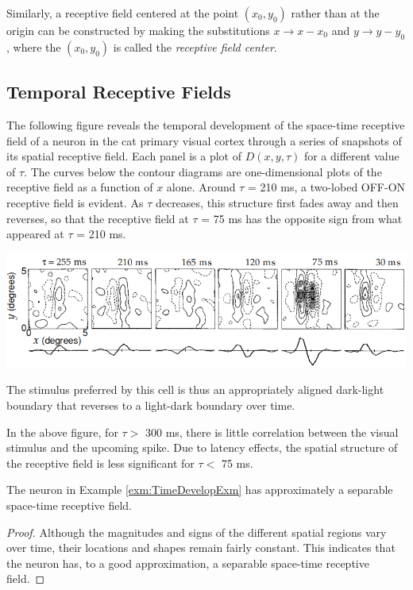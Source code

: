 \begin{rem}
  Similarly, a receptive field centered at the point $(x_0, y_0)$ rather than at the origin can be constructed by making the substitutions $x \to x-x_0$ and $y \to y-y_0$, where the $(x_0, y_0)$ is called the \emph{receptive field center}.
\end{rem}

\subsection{Temporal Receptive Fields}
\label{sec:TemporalReceptiveFields}

\begin{exm}
  \label{exm:TimeDevelopExm}
  The following figure reveals the temporal development of the space-time receptive field of a neuron in the cat primary visual cortex through a series of snapshots of its spatial receptive field.
  Each panel is a plot of $D(x, y,\tau)$ for a different value of $\tau$. The curves below the contour diagrams are one-dimensional plots of the receptive field as a function of $x$ alone. Around $\tau$ = 210 ms, a two-lobed OFF-ON receptive field is evident. As $\tau$ decreases, this structure first fades away and then reverses, so that the receptive field at $\tau$ = 75 ms has the opposite sign from what appeared at $\tau$ = 210 ms.
  \begin{center}
    \includegraphics[scale=0.3]{./png/timeDevelopExm}
  \end{center}
  The stimulus preferred by this cell is thus an appropriately aligned
dark-light boundary that reverses to a light-dark boundary over time.
\end{exm}

\begin{rem}
  In the above figure, for $\tau >$ 300 ms, there is little correlation between the visual stimulus and the upcoming spike. Due to latency effects, the spatial structure of the receptive field is less significant for $\tau <$ 75 ms.
\end{rem}

\begin{prop}
   The neuron in Example \ref{exm:TimeDevelopExm} has approximately a separable space-time receptive field.
\end{prop}
\begin{proof}
  Although the magnitudes and signs of the different spatial regions vary over time, their locations and shapes remain fairly constant. This indicates that the neuron has, to a good approximation, a separable space-time receptive field.
\end{proof}

